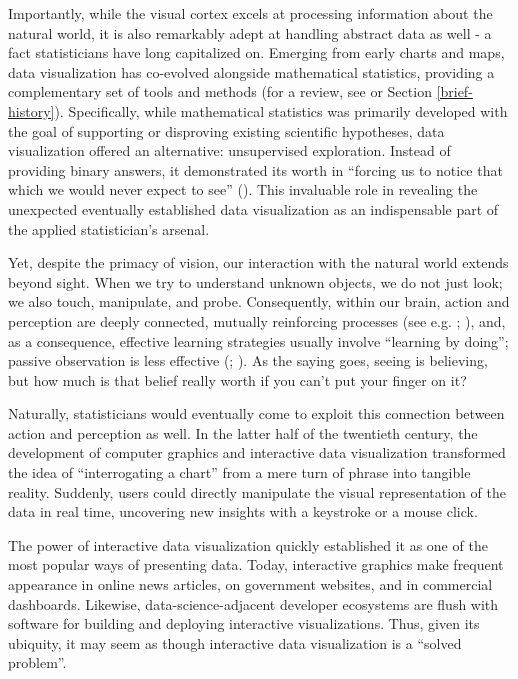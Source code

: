 \documentclass[
  openany]{book}
\theoremstyle{definition}
\theoremstyle{definition}
\theoremstyle{definition}
\theoremstyle{definition}
\theoremstyle{remark}
\begin{document}
Importantly, while the visual cortex excels at processing information about the natural world, it is also remarkably adept at handling abstract data as well - a fact statisticians have long capitalized on. Emerging from early charts and maps, data visualization has co-evolved alongside mathematical statistics, providing a complementary set of tools and methods (for a review, see  or Section \ref{brief-history}). Specifically, while mathematical statistics was primarily developed with the goal of supporting or disproving existing scientific hypotheses, data visualization offered an alternative: unsupervised exploration. Instead of providing binary answers, it demonstrated its worth in ``forcing us to notice that which we would never expect to see'' (). This invaluable role in revealing the unexpected eventually established data visualization as an indispensable part of the applied statistician's arsenal.

Yet, despite the primacy of vision, our interaction with the natural world extends beyond sight. When we try to understand unknown objects, we do not just look; we also touch, manipulate, and probe. Consequently, within our brain, action and perception are deeply connected, mutually reinforcing processes (see e.g. ; ), and, as a consequence, effective learning strategies usually involve ``learning by doing''; passive observation is less effective (; ). As the saying goes, seeing is believing, but how much is that belief really worth if you can't put your finger on it?

Naturally, statisticians would eventually come to exploit this connection between action and perception as well. In the latter half of the twentieth century, the development of computer graphics and interactive data visualization transformed the idea of ``interrogating a chart'' from a mere turn of phrase into tangible reality. Suddenly, users could directly manipulate the visual representation of the data in real time, uncovering new insights with a keystroke or a mouse click.

The power of interactive data visualization quickly established it as one of the most popular ways of presenting data. Today, interactive graphics make frequent appearance in online news articles, on government websites, and in commercial dashboards. Likewise, data-science-adjacent developer ecosystems are flush with software for building and deploying interactive visualizations. Thus, given its ubiquity, it may seem as though interactive data visualization is a ``solved problem''.
\end{document}
